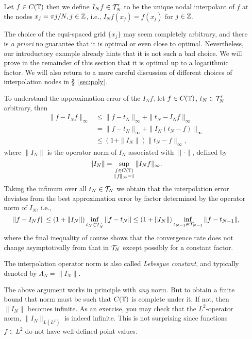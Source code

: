 \medskip

\begin{definition}
  Let $f \in C(\mathbb{T})$ then we define $I_N f \in \mathcal{T}_N'$ to be the unique nodal
  interpolant of $f$ at the nodes $x_j = \pi j / N, j \in \mathbb{Z}$, i.e., $I_N f(x_j)
  = f(x_j)$ for $j \in \mathbb{Z}$.
\end{definition}

\medskip

\begin{remark}
  The choice of the equi-spaced grid $\{x_j\}$ may seem completely arbitrary,
  and there is {\it a priori} no guarantee that it is optimal or even close to
  optimal. Nevertheless, our introductory example already hints that it is not
  such a bad choice. We will prove in the remainder of this section that it is
  optimal up to a logarithmic factor. We will also return to a more careful
  discussion of different choices of interpolation nodes in \S~\ref{sec:poly}.
\end{remark}

To understand the approximation error of the $I_N f$, let $f \in C(\mathbb{T})$, $t_N
\in \mathcal{T}_N'$ arbitrary, then
\begin{align*}
  \|f - I_N f \|_\infty &\leq \|f - t_N \|_\infty + \| t_N - I_N f\|_\infty \\
    & = \|f - t_N \|_\infty + \| I_N (t_N - f) \|_\infty \\
    & \leq (1 + \|I_N\|) \| t_N - f \|_\infty,
\end{align*}
where $\|I_N\|$ is the operator norm of $I_N$ associated with $\|\cdot\|$,
defined by
\[
    \| I_N \| = \sup_{\substack{f \in C(\mathbb{T}) \\ \|f\|_\infty = 1}} \| I_N f \|_\infty.
\]
Taking the infimum over all $t_N \in \mathcal{T}_N$ we obtain that the
interpolation error deviates from the best approximation error by
factor determined by the operator norm of $I_N$, i.e.,
\[
    \|f - I_N f \| \leq (1 + \|I_N\|) \inf_{t_N \in \mathcal{T}_N'} \|f - t_N \|
    \leq (1 + \|I_N\|) \inf_{t_{N-1} \in \mathcal{T}_{N-1}} \|f - t_{N-1} \|,
\]
where the final inequality of course shows that the convergence rate does not
change asymptotivally from that in $\mathcal{T}_N$ except possibly for a constant
factor.

\begin{definition}
  The interpolation operator norm is also called {\em Lebesgue constant}, and
  typically denoted by $\Lambda_N = \| I_N \|$.
\end{definition}

\begin{remark}
  The above argument works in principle with {\em any} norm. But to obtain a
  finite bound that norm must be such that $C(\mathbb{T})$ is complete under it. If
  not, then $\|I_N\|$ becomes infinite. As an exercise, you may check that the
  $L^2$-operator norm, $\|I_N\|_{L(L^2)}$ is indeed infinite. This is not
  surprising since functions $f \in L^2$ do not have well-defined point values.
\end{remark}

